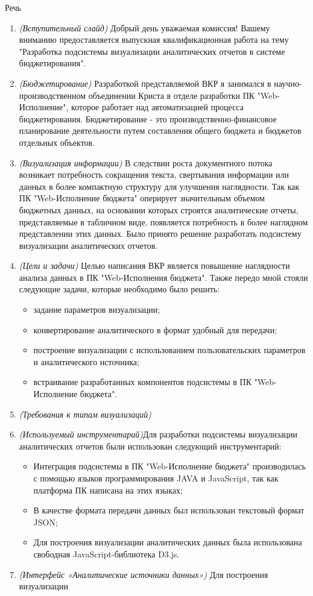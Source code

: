 \documentclass[a4paper, 12pt]{report}
\begin{document}
\begin{center}
	\Large Речь
\end{center}\par
\begin{enumerate}[label=\textbf{\arabic*})]
	\item \textit{(Вступительный слайд)} Добрый день уважаемая комиссия! Вашему вниманию предоставляется выпускная квалификационная работа на тему "Разработка подсистемы визуализации аналитических отчетов в системе бюджетирования".
	\item \textit{(Бюджетирование)} Разработкой представляемой ВКР я занимался в научно-производственном объединении Криста в отделе разработки ПК "Web-Исполнение", которое работает над автоматизацией процесса бюджетирования. Бюджетирование - это производственно-финансовое планирование деятельности путем составления общего бюджета и бюджетов отдельных объектов.
	\item \textit{(Визуализация информации)} В следствии роста документного потока возникает потребность сокращения текста, свертывания информации или данных в более компактную структуру для улучшения наглядности. Так как ПК "Web-Исполнение бюджета" оперирует значительным объемом бюджетных данных, на основании которых строятся аналитические отчеты, представляемые в табличном виде, появляется потребность в более наглядном представлении этих данных. Было принято решение разработать подсистему визуализации аналитических отчетов.
	\item \textit{(Цели и задачи)} Целью написания ВКР является повышение наглядности анализа данных в ПК "Web-Исполнения бюджета". Также передо мной стояли следующие задачи, которые необходимо было решить:
		\begin{itemize}
			\item задание параметров визуализации;
			\item конвертирование аналитического в формат удобный для передачи;
			\item построение визуализации с использованием пользовательских параметров и аналитического источника;
			\item встраивание разработанных компонентов подсистемы в ПК "Web-Исполнение бюджета".
		\end{itemize}
	\item \textit{(Требования к типам визуализаций)} 
	\item \textit{(Используемый инструментарий)}Для разработки подсистемы визуализации аналитических отчетов были использован следующий инструментарий:
		\begin{itemize}
			\item Интеграция подсистемы в ПК "Web-Исполнение бюджета" производилась с помощью языков программирования JAVA и JavaScript, так как платформа ПК написана на этих языках;
			\item В качестве формата передачи данных был использован текстовый формат JSON;
			\item Для построения визуализации аналитических данных была использована свободная JavaScript-библиотека D3.js.
		\end{itemize}
	\item \textit{(Интерфейс «Аналитические источники данных»)} Для построения визуализации 
\end{enumerate}
\end{document}
